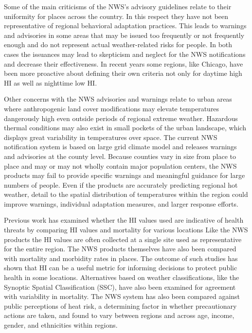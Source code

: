 \documentclass[twocol]{ametsoc}
\begin{document}
Some of the main criticisms of the NWS's advisory guidelines relate to their uniformity for places across the country. In this respect they have not been representative of regional behavioral adaptation practices. This leads to warnings and advisories in some areas that may be issued too frequently or not frequently enough and do not represent actual weather-related risks for people. In both cases the issuances may lead to skepticism and neglect for the NWS notifications and decrease their effectiveness. In recent years some regions, like Chicago, have been more proactive about defining their own criteria not only for daytime high HI as well as nighttime low HI.

Other concerns with the NWS advisories and warnings relate to urban areas where anthropogenic land cover modifications may elevate temperatures dangerously high even outside periods of regional extreme weather. Hazardous thermal conditions may also exist in small pockets of the urban landscape, which displays great variability in temperatures over space.  The current NWS notification system is based on large grid climate model and releases warnings and advisories at the county level. Because counties vary in size from place to place and may or may not wholly contain major population centers, the NWS products may fail to provide specific warnings and meaningful guidance for large numbers of people. Even if the products are accurately predicting regional hot weather, detail to the spatial distribution of temperatures within the region could improve warnings, individual adaptation measures, and larger response efforts.

Previous work has examined whether the HI values used are indicative of health threats by comparing HI values and mortality for various locations\citep{Kalkstein1989,Gaffen1998} Like the NWS products the HI values are often collected at a single site used as representative for the entire region. The NWS products themselves have also been compared with mortality and morbidity rates in places. The outcome of such studies has shown that HI can be a useful metric for informing decisions to protect public health in some locations. Alternatives based on weather classifications, like the Synoptic Spatial Classification (SSC), have also been examined for agreement with variability in mortality. The NWS system has also been compared against public perceptions of heat risk, a determining factor in whether precautionary actions are taken, and found to vary between regions and across age, income, gender, and ethnicities within regions\citep{Kalkstein2007}.
\end{document}
